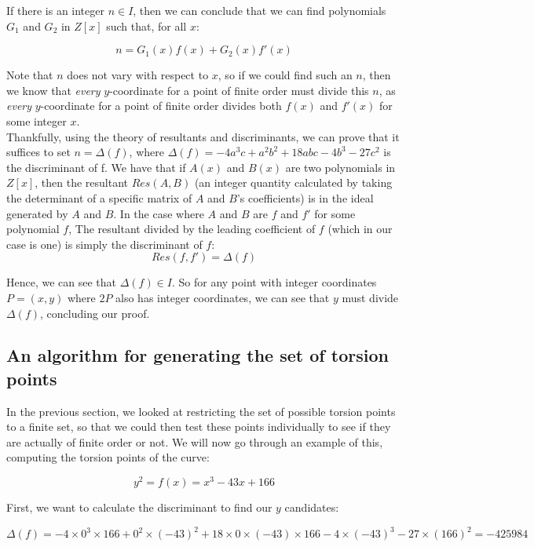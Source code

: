 \documentclass{article}
\begin{document}
If there is an integer $n \in I$, then we can conclude that we can find polynomials $G_1$ and $G_2$ in $Z[x]$ such that, for all $x$:

\[ n = G_1(x)f(x) + G_2(x)f'(x) \]

Note that $n$ does not vary with respect to $x$, so if we could find such an $n$, then we know that \emph{every} $y$-coordinate for a point of finite order must divide this $n$, as \emph{every} $y$-coordinate for a point of finite order divides both $f(x)$ and $f'(x)$ for some integer $x$.\\

Thankfully, using the theory of resultants and discriminants, we can prove that it suffices to set $n = \Delta(f)$, where $\Delta(f) = -4a^3c + a^2b^2 + 18abc - 4b^3 - 27c^2$ is the discriminant of f. We have that if $A(x)$ and $B(x)$ are two polynomials in $Z[x]$, then the resultant $Res(A, B)$ (an integer quantity calculated by taking the determinant of a specific matrix of $A$ and $B$'s coefficients) is in the ideal generated by $A$ and $B$. In the case where $A$ and $B$ are $f$ and $f'$ for some polynomial $f$, The resultant divided by the leading coefficient of $f$ (which in our case is one) is simply the discriminant of $f$: \\

\[ Res(f, f') = \Delta(f) \]

Hence, we can see that $\Delta(f) \in I$. So for any point with integer coordinates $P = (x, y)$ where $2P$ also has integer coordinates, we can see that $y$ must divide $\Delta(f)$, concluding our proof.


\subsection{An algorithm for generating the set of torsion points}

In the previous section, we looked at restricting the set of possible torsion points to a finite set, so that we could then test these points individually to see if they are actually of finite order or not. We will now go through an example of this, computing the torsion points of the curve:

\[y^2 = f(x) = x^3 - 43 x + 166\]

First, we want to calculate the discriminant to find our $y$ candidates:

\[\Delta(f) =  -4 \times 0^3 \times 166 + 0^2 \times (-43)^2 + 18 \times 0 \times (-43) \times 166 - 4 \times (-43)^3 - 27 \times (166)^2 = -425984\]
\end{document}

